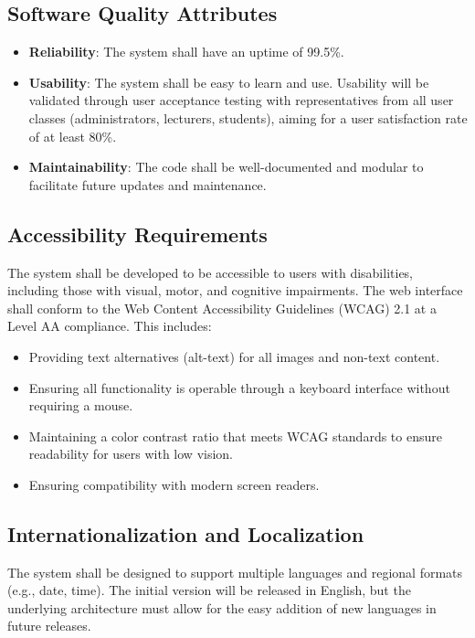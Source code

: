 \documentclass[11pt, a4paper]{article}
\begin{document}
\subsection{Software Quality Attributes}
\label{sec:quality}
\begin{itemize}
    \item \textbf{Reliability}: The system shall have an uptime of 99.5\%.
    \item \textbf{Usability}: The system shall be easy to learn and use. Usability will be validated through user acceptance testing with representatives from all user classes (administrators, lecturers, students), aiming for a user satisfaction rate of at least 80\%.
    \item \textbf{Maintainability}: The code shall be well-documented and modular to facilitate future updates and maintenance.
\end{itemize}

\subsection{Accessibility Requirements}
\label{sec:accessibility}
The system shall be developed to be accessible to users with disabilities, including those with visual, motor, and cognitive impairments. The web interface shall conform to the Web Content Accessibility Guidelines (WCAG) 2.1 at a Level AA compliance. This includes:
\begin{itemize}
    \item Providing text alternatives (alt-text) for all images and non-text content.
    \item Ensuring all functionality is operable through a keyboard interface without requiring a mouse.
    \item Maintaining a color contrast ratio that meets WCAG standards to ensure readability for users with low vision.
    \item Ensuring compatibility with modern screen readers.
\end{itemize}

\subsection{Internationalization and Localization}
\label{sec:i18n}
The system shall be designed to support multiple languages and regional formats (e.g., date, time). The initial version will be released in English, but the underlying architecture must allow for the easy addition of new languages in future releases.
\end{document}
